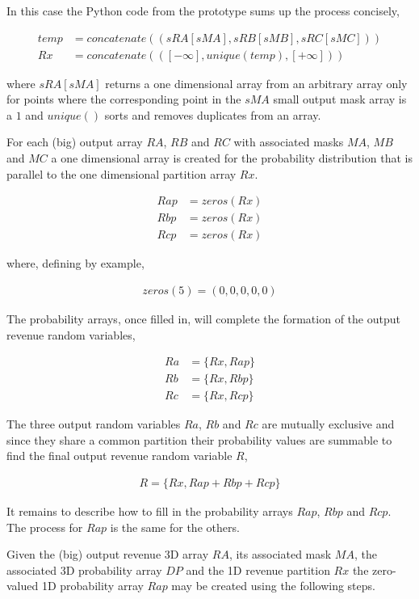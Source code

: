 In this case the Python code from the prototype sums up the process concisely,

\begin{align*}
temp &= concatenate((sRA[sMA], sRB[sMB], sRC[sMC]))\\
Rx &= concatenate(([-\infty], unique(temp), [+\infty]))
\end{align*}

where $sRA[sMA]$ returns a one dimensional array from an arbitrary array only for points where the corresponding point in the $sMA$ small output mask array is a $1$ and $unique()$ sorts and removes duplicates from an array. 

For each (big) output array $RA$, $RB$ and $RC$ with associated masks $MA$, $MB$ and $MC$ a one dimensional array is created for the probability distribution that is parallel to the one dimensional partition array $Rx$. 

\begin{align*}
Rap &= zeros(Rx)\\
Rbp &= zeros(Rx)\\
Rcp &= zeros(Rx)
\end{align*}

where, defining by example,

\begin{align*}
zeros(5) = (0, 0, 0, 0, 0)
\end{align*}

The probability arrays, once filled in, will complete the formation of the output revenue random variables,

\begin{align*}
Ra &= \{Rx, Rap\}\\
Rb &= \{Rx, Rbp\}\\
Rc &= \{Rx, Rcp\}
\end{align*}

The three output random variables $Ra$, $Rb$ and $Rc$ are mutually exclusive and since they share a common partition their probability values are summable to find the final output revenue random variable $R$,

\begin{align*}
R = \{Rx, Rap + Rbp + Rcp\}
\end{align*}

It remains to describe how to fill in the probability arrays $Rap$, $Rbp$ and $Rcp$. The process for $Rap$ is the same for the others.

Given the (big) output revenue 3D array $RA$, its associated mask $MA$, the associated 3D probability array $DP$ and the 1D revenue partition $Rx$ the zero-valued 1D probability array $Rap$ may be created using the following steps. 


